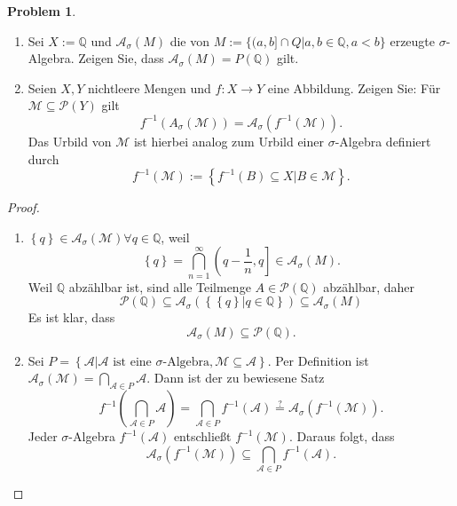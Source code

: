 \documentclass[prb,12pt]{revtex4-2}
\theoremstyle{definition}
\newtheorem{Problem}{Problem}
\theoremstyle{definition}
\newenvironment{parts}{\begin{enumerate}[label=(\alph*)]}{\end{enumerate}}
\newcommand{\Q}{\mathbb{Q}}
\begin{document}
\begin{Problem}
	\begin{parts}
		
	 \item Sei $X := \Q$ und $\mathcal A_\sigma (M)$ die von $M := \{(a, b] \cap Q | a, b \in \Q, a < b\}$ erzeugte $\sigma$-Algebra. Zeigen Sie, dass $\mathcal A_\sigma (M ) = P(\Q)$ gilt.

 \item Seien $X, Y$ nichtleere Mengen und $f:X\to Y$ eine Abbildung. Zeigen Sie: F\"{u}r $\mathcal M\subseteq \mathcal{P}(Y)$ gilt
	 \[
		 f^{-1}\left( A_\sigma(\mathcal M) \right) =\mathcal A_\sigma\left( f^{-1}(\mathcal M) \right) 
	 .\]
	 Das Urbild von $\mathcal M$ ist hierbei analog zum Urbild einer $\sigma$-Algebra definiert durch
	 \[
		 f^{-1}(\mathcal M):=\left\{ f^{-1}(B)\subseteq X|B\in \mathcal M \right\} 
	 .\] 
	\end{parts}
\end{Problem}

\begin{proof}
	\begin{parts}
	\item $\left\{ q \right\} \in \mathcal A_\sigma(\mathcal M)\forall q\in \Q$, weil
		\[
			\left\{ q \right\} =\bigcap_{n=1}^\infty \left(q-\frac{1}{n}, q\right]\in \mathcal A_\sigma(M) 
		.\] 
		Weil $\Q$ abz\"{a}hlbar ist, sind alle Teilmenge $A\in \mathcal P(\Q)$ abz\"{a}hlbar, daher 
		\[
		\mathcal P(\Q)\subseteq \mathcal A_\sigma\left( \left\{ \left\{ q \right\} | q\in \Q \right\}  \right) \subseteq \mathcal A_\sigma(M)
	\]
		Es ist klar, dass
		\[
		\mathcal A_\sigma(M)\subseteq \mathcal P(\Q)
		.\]
	\item 
	
		Sei $ P=\left\{ \mathcal A| \mathcal A\text{ ist eine }\sigma\text{-Algebra},\mathcal M \subseteq \mathcal A \right\} $. Per Definition ist $\mathcal A_\sigma(\mathcal M)=\bigcap_{\mathcal A\in P} \mathcal A$. Dann ist der zu bewiesene Satz
		\[
			f^{-1}\left( \bigcap_{\mathcal A\in P} \mathcal A \right) =\bigcap_{\mathcal A\in P} f^{-1}(\mathcal A)\overset{?}{=}\mathcal A_\sigma\left( f^{-1}\left( \mathcal M \right)  \right) 
		.\]
		Jeder $\sigma$-Algebra $f^{-1}\left( \mathcal A \right) $ entschließt $f^{-1}\left( \mathcal M \right) $. Daraus folgt, dass
		\[
			\mathcal A_\sigma \left( f^{-1}\left( \mathcal M \right)  \right) \subseteq \bigcap_{\mathcal A\in P} f^{-1}(\mathcal A)
		.\] 

	\end{parts}
\end{proof}
\end{document}
